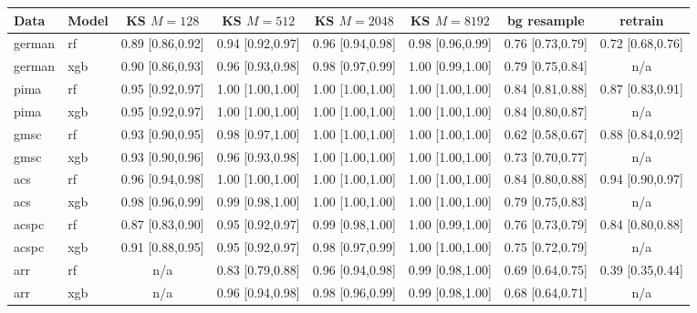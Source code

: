 \begin{tabular}{llcccccc}\toprule
Data & Model & KS $M{=}128$ & KS $M{=}512$ & KS $M{=}2048$ & KS $M{=}8192$ & bg resample & retrain\\\midrule
german & rf & 0.89 [0.86,0.92] & 0.94 [0.92,0.97] & 0.96 [0.94,0.98] & 0.98 [0.96,0.99] & 0.76 [0.73,0.79] & 0.72 [0.68,0.76]\\
german & xgb & 0.90 [0.86,0.93] & 0.96 [0.93,0.98] & 0.98 [0.97,0.99] & 1.00 [0.99,1.00] & 0.79 [0.75,0.84] & n/a\\
pima & rf & 0.95 [0.92,0.97] & 1.00 [1.00,1.00] & 1.00 [1.00,1.00] & 1.00 [1.00,1.00] & 0.84 [0.81,0.88] & 0.87 [0.83,0.91]\\
pima & xgb & 0.95 [0.92,0.97] & 1.00 [1.00,1.00] & 1.00 [1.00,1.00] & 1.00 [1.00,1.00] & 0.84 [0.80,0.87] & n/a\\
gmsc & rf & 0.93 [0.90,0.95] & 0.98 [0.97,1.00] & 1.00 [1.00,1.00] & 1.00 [1.00,1.00] & 0.62 [0.58,0.67] & 0.88 [0.84,0.92]\\
gmsc & xgb & 0.93 [0.90,0.96] & 0.96 [0.93,0.98] & 1.00 [1.00,1.00] & 1.00 [1.00,1.00] & 0.73 [0.70,0.77] & n/a\\
acs & rf & 0.96 [0.94,0.98] & 1.00 [1.00,1.00] & 1.00 [1.00,1.00] & 1.00 [1.00,1.00] & 0.84 [0.80,0.88] & 0.94 [0.90,0.97]\\
acs & xgb & 0.98 [0.96,0.99] & 0.99 [0.98,1.00] & 1.00 [1.00,1.00] & 1.00 [1.00,1.00] & 0.79 [0.75,0.83] & n/a\\
acspc & rf & 0.87 [0.83,0.90] & 0.95 [0.92,0.97] & 0.99 [0.98,1.00] & 1.00 [0.99,1.00] & 0.76 [0.73,0.79] & 0.84 [0.80,0.88]\\
acspc & xgb & 0.91 [0.88,0.95] & 0.95 [0.92,0.97] & 0.98 [0.97,0.99] & 1.00 [1.00,1.00] & 0.75 [0.72,0.79] & n/a\\
arr & rf & n/a & 0.83 [0.79,0.88] & 0.96 [0.94,0.98] & 0.99 [0.98,1.00] & 0.69 [0.64,0.75] & 0.39 [0.35,0.44]\\
arr & xgb & n/a & 0.96 [0.94,0.98] & 0.98 [0.96,0.99] & 0.99 [0.98,1.00] & 0.68 [0.64,0.71] & n/a\\
\bottomrule\end{tabular}